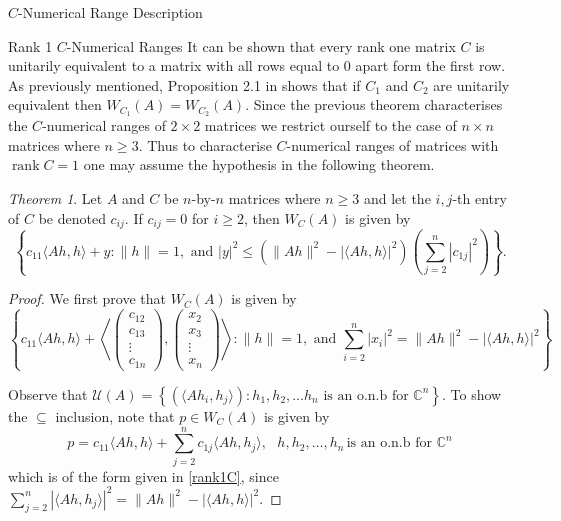 \documentclass[12pt]{article}
\theoremstyle{plain}
\theoremstyle{definition}
\theoremstyle{remark}
\newtheorem{Theorem}{Theorem}[section]
\numberwithin{equation}{section}
\begin{document}
\begin{section}{$C$-Numerical Range Description}
\begin{subsection}{Rank 1 $C$-Numerical Ranges}
It can be shown that every rank one matrix $C$ is unitarily equivalent to a matrix with all rows equal to 0 apart form the first row. As previously mentioned, Proposition 2.1 in \cite{gau2021numerical} shows that if $C_1$ and $C_2$ are unitarily equivalent then $W_{C_1}(A) = W_{C_2}(A)$. Since the previous theorem characterises the $C$-numerical ranges of $2 \times 2$ matrices we restrict ourself to the case of $n \times n$ matrices where $n \geq 3$. Thus to characterise $C$-numerical ranges of matrices with $\operatorname{rank}C = 1$ one may assume the hypothesis in the following theorem.

    \begin{Theorem}\label{uniondisk}
        Let $A$ and $C$ be $n$-by-$n$ matrices where $n\geq 3$ and let the $i,j$-th entry of $C$ be denoted $c_{ij}$. If $c_{ij} = 0 $ for $i \geq 2$, then $W_C(A)$ is given by
        \begin{equation}\label{rank1Cfinal}
            \left\{ c_{11} \langle Ah,h \rangle + y : \|h\| = 1 , \text{ and }  |y|^2 \leq (\|Ah\|^2- |\langle Ah,h\rangle|^2) \left(\sum_{j=2}^n|c_{1j}|^2 \right) \right\}.
        \end{equation}
    \end{Theorem}

\begin{proof}
We first prove that $W_C(A)$ is given by \begin{equation}\label{rank1C}
         \left\{ c_{11} \langle Ah,h \rangle + \left\langle \begin{pmatrix}
            c_{12} \\
            c_{13} \\
            \vdots \\
            c_{1n}
        \end{pmatrix}, \begin{pmatrix}
            x_{2} \\
            x_{3} \\
            \vdots \\
            x_{n}
        \end{pmatrix} \right\rangle : \|h\| = 1 , \text{ and }  \sum_{i=2}^n|x_i|^2 = \|Ah\|^2- |\langle Ah,h\rangle|^2 \right\}
        \end{equation}

Observe that $\mathcal{U}(A) = \left\{(\langle Ah_i,h_j \rangle ) : h_1, h_2, \ldots h_n \text{ is an o.n.b for } \mathbb{C}^n  \right\}$. To show the $\subseteq $ inclusion, note that $p \in W_C(A)$ is given by $$
p = c_{11} \langle Ah,h\rangle +  \sum_{j=2}^n c_{1j}\langle Ah,h_j\rangle , \, \, \, \, h,h_2,\ldots , h_n \, \text{is an o.n.b for } \mathbb{C}^n 
$$
which is of the form given in \eqref{rank1C}, since $\sum_{j=2}^n |\langle Ah,h_j\rangle|^2 = \|Ah\|^2 - |\langle Ah,h\rangle |^2$.


\end{proof}
\end{subsection}
\end{section}
\end{document}
